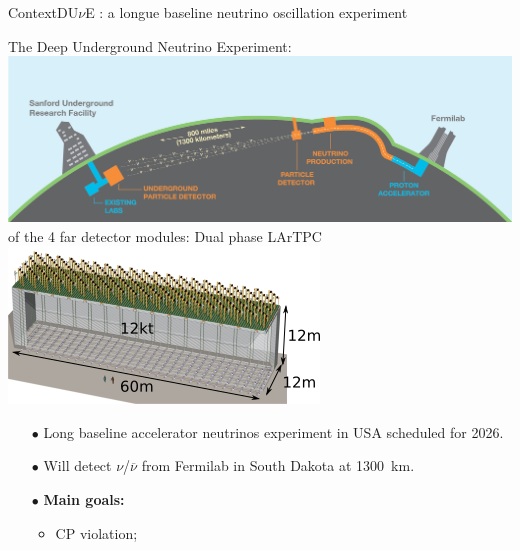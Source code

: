 \documentclass[10pt]{beamer}
\begin{document}
    \begin{frame}{Context}{DU$\nu$E : a longue baseline neutrino oscillation experiment}
    	\begin{scriptsize}
    	\begin{minipage}{0.58\textwidth}
    		\centering
    		The Deep Underground Neutrino Experiment:\\
    		\includegraphics[width=\textwidth]{figures/contexte/dune.jpg}\\
    		\vspace{0.5cm}
    		 of the 4 far detector modules: Dual phase LArTPC\\
    		\includegraphics[width=\textwidth]{figures/contexte/dune_module.png}\\
    	\end{minipage}
    	\hfill
    	\begin{minipage}{0.38\textwidth}
    		\begin{itemize}
    			\item[$\bullet$] Long baseline accelerator neutrinos experiment in USA scheduled for 2026.
    			\item[$\bullet$] Will detect $\nu$/$\overline{\nu}$ from Fermilab in South Dakota at \SI{1300}{\kilo\meter}.
    			\item[$\bullet$] \textbf{Main goals: }
	    			\begin{itemize}
	    				\item CP violation;

\end{itemize}
\end{itemize}
\end{minipage}
\end{scriptsize}
\end{frame}
\end{document}
